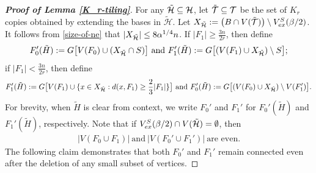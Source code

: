 \documentclass[11pt, a4paper]{article}
\theoremstyle{definition}
\newcommand{\<}{\subseteq}
\begin{document}
\begin{proof}[\bf Proof of Lemma \ref{K_r-tiling}]
For any $\Tilde{\mathcal{H}}\subseteq \mathcal{H}$, let $\Tilde{\mathcal{T}}\subseteq \mathcal{T}$ be the set of $K_r$ copies obtained by extending the bases in $\widetilde{\mathcal{H}}$. Let $X_{\Tilde{\mathcal{H}}} :=\big(B\cap V(\Tilde{\mathcal{T}})\big)\setminus V_{ex}^S(\beta/2)$. It follows from \eqref{size-of-ne} that $|X_{\Tilde{\mathcal{H}}}|\le 8\alpha^{1/4}n$. %
If $|F_1|\ge \frac{3n}{2r}$, 
then define 
\begin{align}\label{eq:F_0}
F_0'(\Tilde{H}):=G\big[V(F_0)\cup (X_{\Tilde{\mathcal{H}}}\cap S)\big] \ \text{and} \ F_1'(\Tilde{H}):=G\big [(V(F_1)\cup X_{\Tilde{\mathcal{H}}})\setminus S\big];
\end{align}
if $|F_1|< \frac{3n}{2r}$, then define  
\begin{align}\label{eq:F_1}
F_1'(\Tilde{H}):=G\big[V(F_1)\cup \{x\in X_{\Tilde{\mathcal{H}}} : d(x,F_1)\ge \frac{2}{3}|F_1|\}\big] \ \text{and} \ F_0'(\Tilde{H}):= G\big[(V(F_0)\cup X_{\Tilde{\mathcal{H}}})\setminus V(F_1')\big].
\end{align}
For brevity, when $\widetilde{H}$ is clear from context, we write $F_0'$ and $F_1'$ for $F_0'(\widetilde{H})$ and $F_1'(\widetilde{H})$, respectively.
Note that if $V_{ex}^S(\beta/2) \cap V(\Tilde{\mathcal{H}})=\emptyset$, then 
\begin{align}\label{even-order}
|V(F_0\cup F_1)|\ \text{and}\ 
|V(F_0'\cup F_1')|\ \text{are even}.
\end{align}
The following claim demonstrates that both $F_0'$ and $F_1'$ remain connected even after the deletion of any small subset of vertices.


\end{proof}
\end{document}
